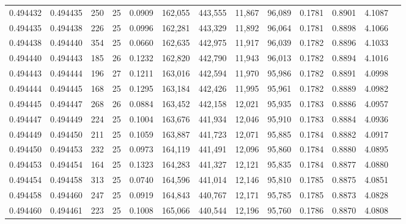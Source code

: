 \begin{tabular}{rrrrrrrrrrrrr}
0.494432 & 0.494435 & 250 &  25 &                                     0.0909 & 162,055 & 443,555 &  11,867 &  96,089 & 0.1781 & 0.8901 & 4.1087 \\
0.494435 & 0.494438 & 226 &  25 &                                     0.0996 & 162,281 & 443,329 &  11,892 &  96,064 & 0.1781 & 0.8898 & 4.1066 \\
0.494438 & 0.494440 & 354 &  25 &                                     0.0660 & 162,635 & 442,975 &  11,917 &  96,039 & 0.1782 & 0.8896 & 4.1033 \\
0.494440 & 0.494443 & 185 &  26 &                                     0.1232 & 162,820 & 442,790 &  11,943 &  96,013 & 0.1782 & 0.8894 & 4.1016 \\
0.494443 & 0.494444 & 196 &  27 &                                     0.1211 & 163,016 & 442,594 &  11,970 &  95,986 & 0.1782 & 0.8891 & 4.0998 \\
0.494444 & 0.494445 & 168 &  25 &                                     0.1295 & 163,184 & 442,426 &  11,995 &  95,961 & 0.1782 & 0.8889 & 4.0982 \\
0.494445 & 0.494447 & 268 &  26 &                                     0.0884 & 163,452 & 442,158 &  12,021 &  95,935 & 0.1783 & 0.8886 & 4.0957 \\
0.494447 & 0.494449 & 224 &  25 &                                     0.1004 & 163,676 & 441,934 &  12,046 &  95,910 & 0.1783 & 0.8884 & 4.0936 \\
0.494449 & 0.494450 & 211 &  25 &                                     0.1059 & 163,887 & 441,723 &  12,071 &  95,885 & 0.1784 & 0.8882 & 4.0917 \\
0.494450 & 0.494453 & 232 &  25 &                                     0.0973 & 164,119 & 441,491 &  12,096 &  95,860 & 0.1784 & 0.8880 & 4.0895 \\
0.494453 & 0.494454 & 164 &  25 &                                     0.1323 & 164,283 & 441,327 &  12,121 &  95,835 & 0.1784 & 0.8877 & 4.0880 \\
0.494454 & 0.494458 & 313 &  25 &                                     0.0740 & 164,596 & 441,014 &  12,146 &  95,810 & 0.1785 & 0.8875 & 4.0851 \\
0.494458 & 0.494460 & 247 &  25 &                                     0.0919 & 164,843 & 440,767 &  12,171 &  95,785 & 0.1785 & 0.8873 & 4.0828 \\
0.494460 & 0.494461 & 223 &  25 &                                     0.1008 & 165,066 & 440,544 &  12,196 &  95,760 & 0.1786 & 0.8870 & 4.0808 \\

\end{tabular}
